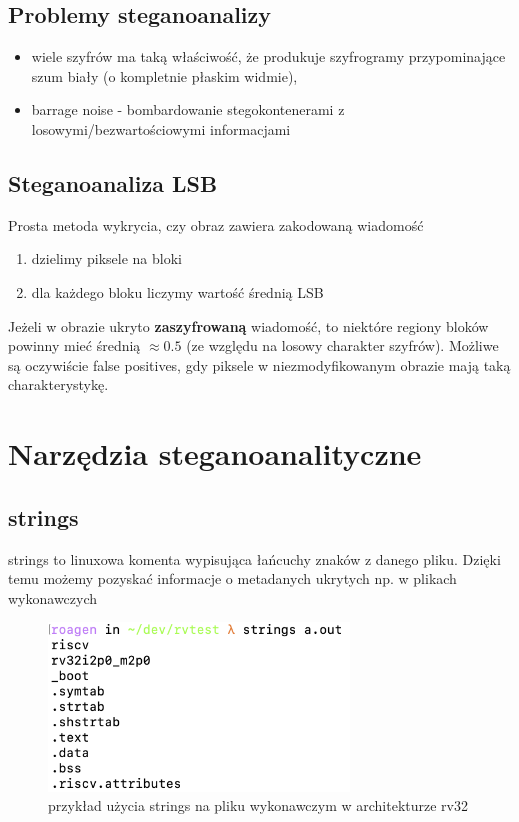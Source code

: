 \documentclass{article}
\begin{document}
\subsection{Problemy steganoanalizy}
\begin{itemize}
	\item wiele szyfrów ma taką właściwość, że produkuje szyfrogramy przypominające szum biały (o kompletnie płaskim widmie),
	\item barrage noise - bombardowanie stegokontenerami z losowymi/bezwartościowymi informacjami
\end{itemize}
\subsection{Steganoanaliza LSB}
Prosta metoda wykrycia, czy obraz zawiera zakodowaną wiadomość
\begin{enumerate}
	\item dzielimy piksele na bloki
	\item dla każdego bloku liczymy wartość średnią LSB
\end{enumerate}
Jeżeli w obrazie ukryto \textbf{zaszyfrowaną} wiadomość, to niektóre regiony bloków
powinny mieć średnią $\approx 0.5$ (ze względu na losowy charakter szyfrów). Możliwe są
oczywiście false positives, gdy piksele w niezmodyfikowanym obrazie mają taką charakterystykę.
\section{Narzędzia steganoanalityczne}
\subsection{strings}
strings to linuxowa komenta wypisująca łańcuchy znaków z danego pliku. Dzięki temu możemy pozyskać informacje 
o metadanych ukrytych np. w plikach wykonawczych
\begin{figure}[H]
	\centering
	\includegraphics[width=8cm]{strings_example}
	\caption{przykład użycia strings na pliku wykonawczym w architekturze rv32}
\end{figure}
\end{document}
